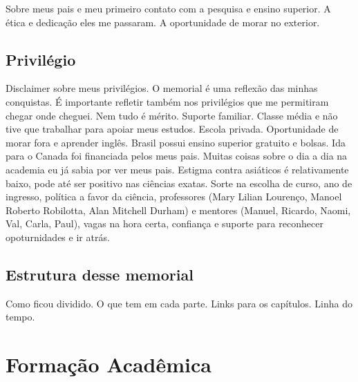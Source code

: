 \documentclass[10pt,a4paper,oneside]{book}
\begin{document}
Sobre meus pais e meu primeiro contato com a pesquisa e ensino superior.
A ética e dedicação eles me passaram.
A oportunidade de morar no exterior.



\section{Privilégio}

Disclaimer sobre meus privilégios.
O memorial é uma reflexão das minhas conquistas.
É importante refletir também nos privilégios que me permitiram chegar onde cheguei.
Nem tudo é mérito.
Suporte familiar.
Classe média e não tive que trabalhar para apoiar meus estudos.
Escola privada.
Oportunidade de morar fora e aprender inglês.
Brasil possui ensino superior gratuito e bolsas.
Ida para o Canada foi financiada pelos meus pais.
Muitas coisas sobre o dia a dia na academia eu já sabia por ver meus pais.
Estigma contra asiáticos é relativamente baixo, pode até ser positivo nas ciências exatas.
Sorte na escolha de curso, ano de ingresso, política a favor da ciência,
professores (Mary Lilian Lourenço, Manoel Roberto Robilotta, Alan Mitchell
Durham) e mentores (Manuel, Ricardo,
Naomi, Val, Carla, Paul), vagas na hora certa, confiança e suporte para reconhecer
opoturnidades e ir atrás.

\section{Estrutura desse memorial}

Como ficou dividido. O que tem em cada parte. Links para os capítulos. Linha do
tempo.

\chapter{Formação Acadêmica}
\end{document}
